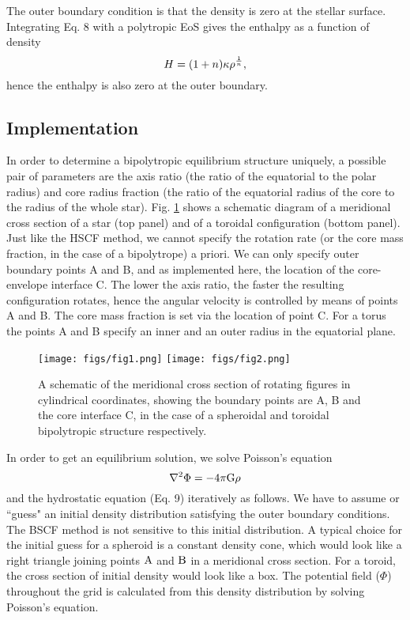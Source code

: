 \documentclass[a4paper,fleqn,usenatbib]{mnras}
\begin{document}
The outer boundary condition is that the density is zero at the stellar surface. Integrating Eq. 8 with a polytropic EoS gives the enthalpy as a function of density
 \begin{equation}
H = (1+n) {\rm \kappa} \rho^{\frac{1}{n}} {\rm, }
\end{equation}
hence the enthalpy is also zero at the outer boundary.



\subsection{Implementation}
\label{Implementation}

In order to determine a bipolytropic equilibrium structure uniquely, a possible pair of parameters are the axis ratio (the ratio of the equatorial to the polar radius) and core radius fraction (the ratio of the equatorial radius of the core to the radius of the whole star).   
Fig. \ref{fig:schematic} shows a schematic diagram of a meridional cross section of a star (top panel) and of a toroidal configuration (bottom panel). 
Just like the HSCF method, we cannot specify the rotation rate (or the core mass fraction, in the case of a bipolytrope) a priori. We can only specify outer boundary points A and B, and as implemented here, the location of the core-envelope interface C.  
The lower the axis ratio, the faster the resulting configuration rotates, hence the angular velocity is controlled by means of points A and B. The core mass fraction is set via the location of point C. For a torus the points A and B specify an inner and an outer radius in the equatorial plane. 

\begin{figure} 
\centering
\texttt{[image: figs/fig1.png]}
\texttt{[image: figs/fig2.png]}
\caption{A schematic of the meridional cross section of rotating figures in cylindrical coordinates, showing the boundary points are A, B and the core interface C, in the case of a spheroidal and toroidal bipolytropic structure respectively.}
\label{fig:schematic}
\end{figure}

In order to get an equilibrium solution, we solve Poisson's equation 
\begin{equation}
\nabla ^2 \Phi = - 4 {\rm \pi G} \rho
\end{equation}
and the hydrostatic equation (Eq. 9) iteratively as follows. We have to assume or ``guess" an initial density distribution satisfying the outer boundary conditions. The BSCF method is not sensitive to this initial distribution. 
A typical choice for the initial guess for a spheroid is a constant density cone, which would look like a right triangle joining points $\rm A$ and $\rm B$ in a meridional cross section. For a toroid, the cross section of initial density would look like a box. 
The potential field ($\Phi$) throughout the grid is calculated from this density distribution by solving Poisson's equation. 
\end{document}
